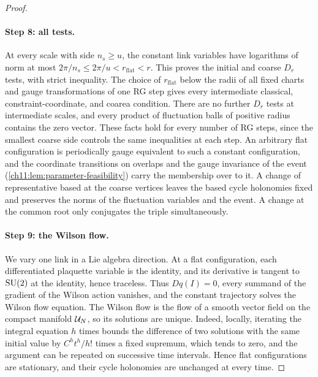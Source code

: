 \begin{proof}
\paragraph{Step 8: all tests.}
At every scale with side $n_s\ge u$, the constant link variables have logarithms of norm at most $2\pi/n_s\le2\pi/u<r_{\mathrm{flat}}<r$. This proves the initial and coarse $D_r$ tests, with strict inequality. The choice of $r_{\mathrm{flat}}$ below the radii of all fixed charts and gauge transformations of one RG step gives every intermediate classical, constraint-coordinate, and coarea condition. There are no further $D_r$ tests at intermediate scales, and every product of fluctuation balls of positive radius contains the zero vector. These facts hold for every number of RG steps, since the smallest coarse side controls the same inequalities at each step. An arbitrary flat configuration is periodically gauge equivalent to such a constant configuration, and the coordinate transitions on overlaps and the gauge invariance of the event (\cref{ch11:lem:parameter-feasibility}) carry the membership over to it. A change of representative based at the coarse vertices leaves the based cycle holonomies fixed and preserves the norms of the fluctuation variables and the event. A change at the common root only conjugates the triple simultaneously.

\paragraph{Step 9: the Wilson flow.}
We vary one link in a Lie algebra direction. At a flat configuration, each differentiated plaquette variable is the identity, and its derivative is tangent to $\mathrm{SU}(2)$ at the identity, hence traceless. Thus $Dq(I)=0$, every summand of the gradient of the Wilson action vanishes, and the constant trajectory solves the Wilson flow equation. The Wilson flow is the flow of a smooth vector field on the compact manifold $\mathcal U_{N}$, so its solutions are unique. Indeed, locally, iterating the integral equation $h$ times bounds the difference of two solutions with the same initial value by $C^ht^h/h!$ times a fixed supremum, which tends to zero, and the argument can be repeated on successive time intervals. Hence flat configurations are stationary, and their cycle holonomies are unchanged at every time.


\end{proof}
